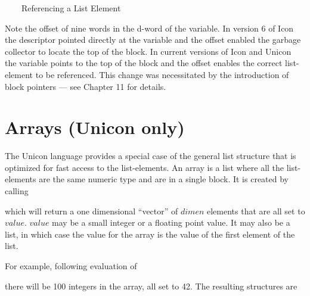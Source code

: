 \ \ \ \ Referencing a List Element

Note the offset of nine words in the d-word of the variable.  In version 6 of
Icon the descriptor pointed directly at the variable and the offset enabled the
garbage collector to locate the top of the block. In current versions of Icon
and Unicon the variable points to the top of the block and the offset enables
the correct list-element to be referenced. This change was necessitated by the
introduction of block pointers --- see Chapter 11 for details.

\section{Arrays (Unicon only)}

The Unicon language provides a special case of the general list structure
that is optimized for fast access to the list-elements. An array is a list
where all the list-elements are the same numeric type and are in a single
block. It is created by calling


\noindent which will return a one dimensional ``vector'' of $dimen$
elements that are all set to $value$.  $value$ may be a small integer or
a floating point value. It may also be a list, in which case the value for
the array is the value of the first element of the list.


For example, following evaluation of


\noindent 
there will be 100 integers in the array, all set to 42.
The resulting structures are

